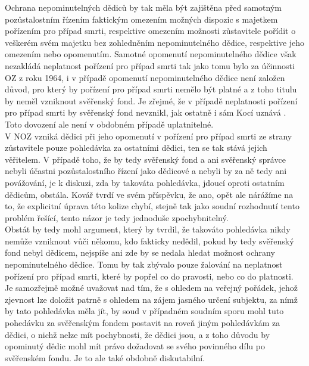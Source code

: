 \documentclass{article}
\begin{document}
 Ochrana nepominutelných dědiců by tak měla být zajištěna před samotným pozůstalostním řízením faktickým omezením možných dispozic s majetkem pořízením pro případ smrti, respektive omezením možnosti zůstavitele pořídit o veškerém svém majetku bez zohledněním nepominutelného dědice, respektive jeho omezením nebo opomenutím. Samotné opomenutí nepominutelného dědice však nezakládá neplatnost pořízení pro případ smrti tak jako tomu bylo za účinnosti OZ z roku 1964, i v případě opomenutí nepominutelného dědice není založen důvod, pro který by pořízení pro případ smrti nemělo být platné a z toho titulu by neměl vzniknout svěřenský fond. Je zřejmé, že v případě neplatnosti pořízení pro případ smrti by svěřenský fond nevznikl, jak ostatně i sám Kocí uznává . Toto dovození ale není v obdobném případě uplatnitelné.\\
 
 V NOZ vzniká dědici při jeho opomenutí v pořízení pro případ smrti ze strany zůstavitele pouze pohledávka za ostatními dědici, ten se tak stává jejich věřitelem. V případě toho, že by tedy svěřenský fond a ani svěřenský správce nebyli účastni pozůstalostního řízení jako dědicové a nebyli by za ně tedy ani povážování, je k diskuzi, zda by takováta pohledávka, jdoucí oproti ostatním dědicům, obstála. Kovář tvrdí ve svém příspěvku, že ano, opět ale nárážíme na to, že explicitní úprava této kolize chybí, stejně tak jako soudní rozhodnutí tento problém řešící, tento názor je tedy jednoduše zpochybnitelný.\\
 
 Obstát by tedy mohl argument, který by tvrdil, že takováto pohledávka nikdy nemůže vzniknout vůči někomu, kdo fakticky nedědil, pokud by tedy svěřenský fond nebyl dědicem, nejspíše ani zde by se nedala hledat možnost ochrany nepominutelného dědice. Tomu by tak zbývalo pouze žalování na neplatnost pořízení pro případ smrti, které by popřel co do pravosti, nebo co do platnosti.\\
  
  Je samozřejmě možné uvažovat nad tím, že s ohledem na veřejný pořádek, jehož zjevnost lze doložit patrně s ohledem na zájem jasného určení subjektu, za nímž by tato pohledávka měla jít, by soud v případném soudním sporu mohl tuto pohedávku za svěřenským fondem postavit na roveň jiným pohledávkám za dědici, o nichž nelze mít pochybnosti, že dědici jsou, a z toho důvodu by opominutý dědic mohl mít právo dožadovat se svého povinného dílu po svěřenském fondu. Je to ale také obdobně diskutabilní.\\
  
\end{document}
